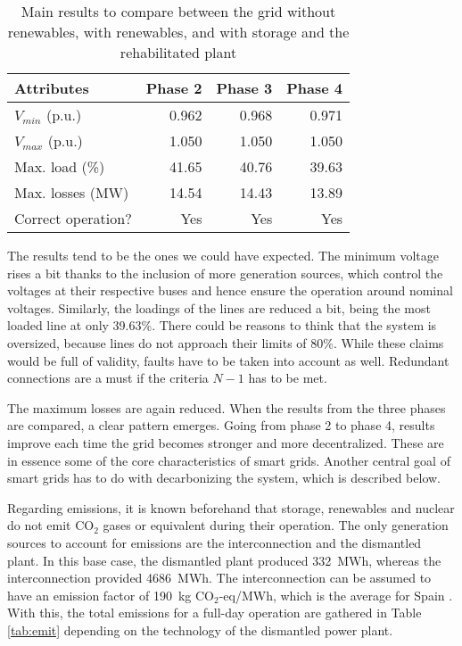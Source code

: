 \begin{table}[!htb]\centering
  \begin{tabular}{lrrr}
    \hline
    \textbf{Attributes} & \textbf{Phase 2} & \textbf{Phase 3} & \textbf{Phase 4}\\
    \hline
    $V_{min}$ (p.u.) & 0.962 & 0.968 & 0.971 \\
    $V_{max}$ (p.u.) & 1.050 & 1.050 & 1.050 \\
    Max. load (\%) & 41.65 & 40.76 & 39.63 \\
    Max. losses (MW) & 14.54 & 14.43 & 13.89 \\
    Correct operation? & Yes & Yes & Yes \\
    \hline
  \end{tabular}
  \caption{Main results to compare between the grid without renewables, with renewables, and with storage and the rehabilitated plant}
  \label{tab:compare2}
\end{table}
The results tend to be the ones we could have expected. The minimum voltage rises a bit thanks to the inclusion of more generation sources, which control the voltages at their respective buses and hence ensure the operation around nominal voltages. Similarly, the loadings of the lines are reduced a bit, being the most loaded line at only 39.63\%. There could be reasons to think that the system is oversized, because lines do not approach their limits of 80\%. While these claims would be full of validity, faults have to be taken into account as well. Redundant connections are a must if the criteria $N-1$ has to be met. 

The maximum losses are again reduced. When the results from the three phases are compared, a clear pattern emerges. Going from phase 2 to phase 4, results improve each time the grid becomes stronger and more decentralized. These are in essence some of the core characteristics of smart grids. Another central goal of smart grids has to do with decarbonizing the system, which is described below. 

Regarding emissions, it is known beforehand that storage, renewables and nuclear do not emit CO$_2$ gases or equivalent during their operation. The only generation sources to account for emissions are the interconnection and the dismantled plant. In this base case, the dismantled plant produced 332~MWh, whereas the interconnection provided 4686~MWh. The interconnection can be assumed to have an emission factor of 190~kg CO$_2$-eq/MWh, which is the average for Spain \cite{ree_co2, spork2015increasing}. With this, the total emissions for a full-day operation are gathered in Table \ref{tab:emit} depending on the technology of the dismantled power plant. 

